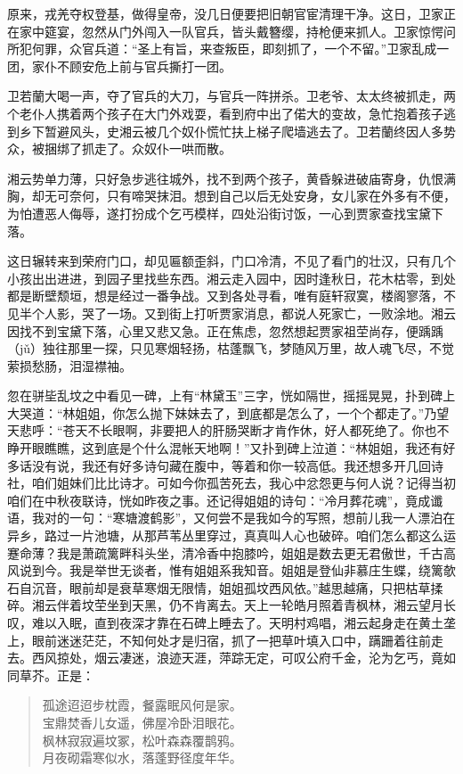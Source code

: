 \documentclass[12pt,oneside]{book}
\newenvironment{shici}{%
\begin{verse}%
\centering\large\hspace{12pt}}%
{\end{verse}}
\begin{document}
原来，戎羌夺权登基，做得皇帝，没几日便要把旧朝官宦清理干净。这日，卫家正在家中筵宴，忽然从门外闯入一队官兵，皆头戴簪缨，持枪便来抓人。卫家惊愕问所犯何罪，众官兵道：“圣上有旨，来查叛臣，即刻抓了，一个不留。”卫家乱成一团，家仆不顾安危上前与官兵撕打一团。

卫若蘭大喝一声，夺了官兵的大刀，与官兵一阵拼杀。卫老爷、太太终被抓走，两个老仆人携着两个孩子在大门外戏耍，看到府中出了偌大的变故，急忙抱着孩子逃到乡下暂避风头，史湘云被几个奴仆慌忙扶上梯子爬墙逃去了。卫若蘭终因人多势众，被捆绑了抓走了。众奴仆一哄而散。

湘云势单力薄，只好急步逃往城外，找不到两个孩子，黄昏躲进破庙寄身，仇恨满胸，却无可奈何，只有啼哭抹泪。想到自己以后无处安身，女儿家在外多有不便，为怕遭恶人侮辱，遂打扮成个乞丐模样，四处沿街讨饭，一心到贾家查找宝黛下落。

这日辗转来到荣府门口，却见匾额歪斜，门口冷清，不见了看门的壮汉，只有几个小孩出出进进，到园子里找些东西。湘云走入园中，因时逢秋日，花木枯零，到处都是断壁颓垣，想是经过一番争战。又到各处寻看，唯有庭轩寂寞，楼阁寥落，不见半个人影，哭了一场。又到街上打听贾家消息，都说人死家亡，一败涂地。湘云因找不到宝黛下落，心里又悲又急。正在焦虑，忽然想起贾家祖茔尚存，便踽踽（jǔ）独往那里一探，只见寒烟轻扬，枯蓬飘飞，梦随风万里，故人魂飞尽，不觉萦损愁肠，泪湿襟袖。

忽在骈坒乱坟之中看见一碑，上有“林黛玉”三字，恍如隔世，摇摇晃晃，扑到碑上大哭道：“林姐姐，你怎么抛下妹妹去了，到底都是怎么了，一个个都走了。”乃望天悲呼：“苍天不长眼啊，非要把人的肝肠哭断才肯作休，好人都死绝了。你也不睁开眼瞧瞧，这到底是个什么混帐天地啊！”又扑到碑上泣道：“林姐姐，我还有好多话没有说，我还有好多诗句藏在腹中，等着和你一较高低。我还想多开几回诗社，咱们姐妹们比比诗才。可如今你孤苦死去，我心中忿怨更与何人说？记得当初咱们在中秋夜联诗，恍如昨夜之事。还记得姐姐的诗句：“冷月葬花魂”，竟成谶语，我对的一句：“寒塘渡鹤影”，又何尝不是我如今的写照，想前儿我一人漂泊在异乡，路过一片池塘，从那芦苇丛里穿过，真真叫人心也破碎。咱们怎么都这么运蹇命薄？我是萧疏篱畔科头坐，清冷香中抱膝吟，姐姐是数去更无君傲世，千古高风说到今。我是举世无谈者，惟有姐姐系我知音。姐姐是登仙非慕庄生蝶，绕篱欹石自沉音，眼前却是衰草寒烟无限情，姐姐孤坟西风依。”越思越痛，只把枯草揉碎。湘云伴着坟茔坐到天黑，仍不肯离去。天上一轮皓月照着青枫林，湘云望月长叹，难以入眠，直到夜深才靠在石碑上睡去了。天明村鸡唱，湘云起身走在黄土垄上，眼前迷迷茫茫，不知何处才是归宿，抓了一把草叶填入口中，蹒跚着往前走去。西风掠处，烟云凄迷，浪迹天涯，萍踪无定，可叹公府千金，沦为乞丐，竟如同草芥。正是：

\begin{shici}
孤途迢迢步枕霞，餐露眠风何是家。\\
宝鼎焚香儿女遥，佛屋冷卧泪眼花。\\
枫林寂寂遍坟冢，松叶森森覆鹊鸦。\\
月夜砌霜寒似水，落蓬野径度年华。
\end{shici}
\end{document}
